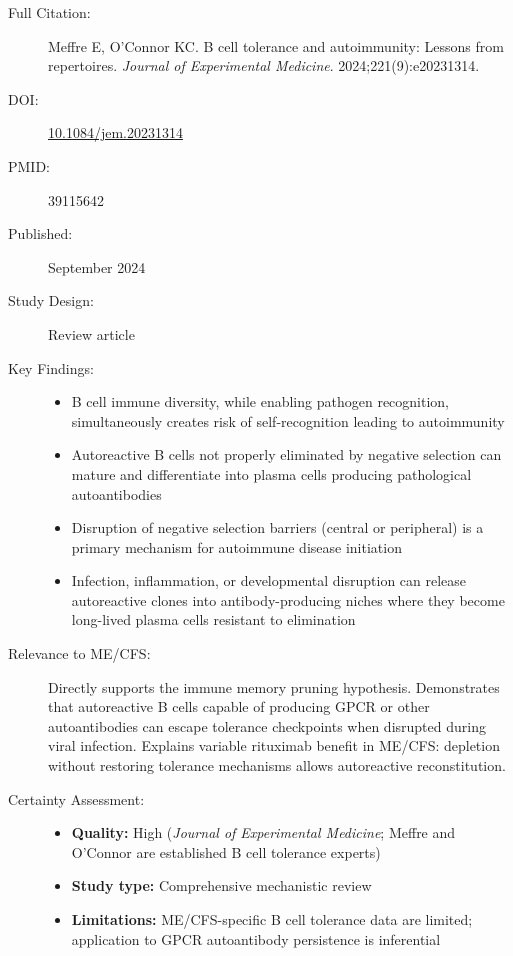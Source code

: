 \begin{description}
    \item[Full Citation:] Meffre E, O'Connor KC. B cell tolerance and autoimmunity: Lessons from repertoires. \textit{Journal of Experimental Medicine}. 2024;221(9):e20231314.
    \item[DOI:] \href{https://doi.org/10.1084/jem.20231314}{10.1084/jem.20231314}
    \item[PMID:] 39115642
    \item[Published:] September 2024
    \item[Study Design:] Review article
    \item[Key Findings:]
    \begin{itemize}
        \item B cell immune diversity, while enabling pathogen recognition, simultaneously creates risk of self-recognition leading to autoimmunity
        \item Autoreactive B cells not properly eliminated by negative selection can mature and differentiate into plasma cells producing pathological autoantibodies
        \item Disruption of negative selection barriers (central or peripheral) is a primary mechanism for autoimmune disease initiation
        \item Infection, inflammation, or developmental disruption can release autoreactive clones into antibody-producing niches where they become long-lived plasma cells resistant to elimination
    \end{itemize}
    \item[Relevance to ME/CFS:] Directly supports the immune memory pruning hypothesis. Demonstrates that autoreactive B cells capable of producing GPCR or other autoantibodies can escape tolerance checkpoints when disrupted during viral infection. Explains variable rituximab benefit in ME/CFS: depletion without restoring tolerance mechanisms allows autoreactive reconstitution.
    \item[Certainty Assessment:]
    \begin{itemize}
        \item \textbf{Quality:} High (\textit{Journal of Experimental Medicine}; Meffre and O'Connor are established B cell tolerance experts)
        \item \textbf{Study type:} Comprehensive mechanistic review
        \item \textbf{Limitations:} ME/CFS-specific B cell tolerance data are limited; application to GPCR autoantibody persistence is inferential
    \end{itemize}
\end{description}


